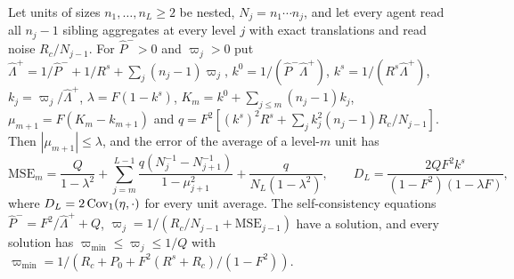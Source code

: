 \begin{lemma}\label{lem:rfm-nested-law}
Let units of sizes $n_1,\dots,n_L\ge2$ be nested, $N_j=n_1\cdots n_j$, and let every agent read all $n_j-1$ sibling aggregates at every level $j$ with exact translations and read noise $R_c/N_{j-1}$. For $\hat P^->0$ and $\varpi_j>0$ put $\hat\Lambda^+=1/\hat P^-+1/R^s+\sum_j(n_j-1)\varpi_j$, $k^0=1/(\hat P^-\hat\Lambda^+)$, $k^s=1/(R^s\hat\Lambda^+)$, $k_j=\varpi_j/\hat\Lambda^+$, $\lambda=F(1-k^s)$, $K_m=k^0+\sum_{j\le m}(n_j-1)k_j$, $\mu_{m+1}=F(K_m-k_{m+1})$ and $q=F^2[(k^s)^2R^s+\sum_jk_j^2(n_j-1)R_c/N_{j-1}]$. Then $|\mu_{m+1}|\le\lambda$, and the error of the average of a level-$m$ unit has
\begin{equation}\label{eq:rfm-nested-mse}
\mathrm{MSE}_m=\frac{Q}{1-\lambda^2}+\sum_{j=m}^{L-1}\frac{q(N_j^{-1}-N_{j+1}^{-1})}{1-\mu_{j+1}^2}+\frac{q}{N_L(1-\lambda^2)},\qquad D_L=\frac{2QF^2k^s}{(1-F^2)(1-\lambda F)},
\end{equation}
where $D_L=2\operatorname{Cov}_1(\eta,\cdot)$ for every unit average.
The self-consistency equations $\hat P^-=F^2/\hat\Lambda^++Q$, $\varpi_j=1/(R_c/N_{j-1}+\mathrm{MSE}_{j-1})$ have a solution, and every solution has $\varpi_{\min}\le\varpi_j\le1/Q$ with $\varpi_{\min}=1/(R_c+P_0+F^2(R^s+R_c)/(1-F^2))$.
\end{lemma}

